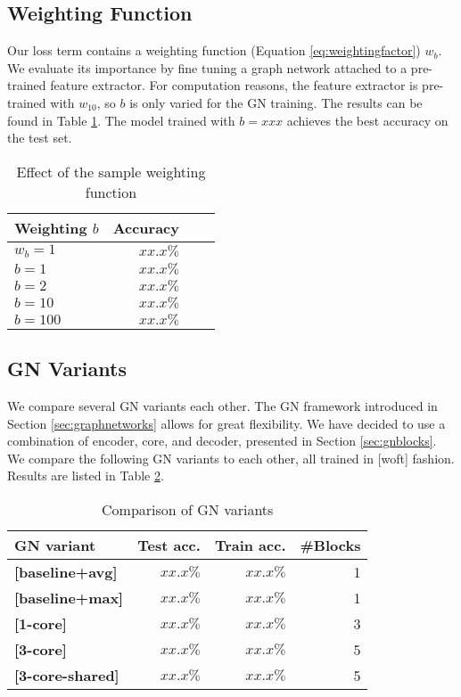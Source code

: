 \subsection{Weighting Function}

Our loss term contains a weighting function (Equation \ref{eq:weightingfactor}) $w_b$. We evaluate its importance by fine tuning a graph network attached to a pre-trained feature extractor. For computation reasons, the feature extractor is pre-trained with $w_{10}$, so $b$ is only varied for the GN training. The results can be found in Table \ref{tab:weightingbase}. The model trained with $b=xxx$ achieves the best accuracy on the test set.

\begin{table}
    \centering
    \begin{tabular}{lrrr}
        \textbf{Weighting $b$} & \textbf{Accuracy}\\\hline
        $w_b=1$ & $xx.x\%$\\
        $b=1$ & $xx.x\%$\\
        $b=2$ & $xx.x\%$\\
        $b=10$ & $xx.x\%$\\
        $b=100$ & $xx.x\%$\\
    \end{tabular}
    \caption[Effect of the sample weighting function]{Effect of the sample weighting function}
    \label{tab:weightingbase}
\end{table}

\subsection{GN Variants}

We compare several GN variants each other. The GN framework introduced in Section \ref{sec:graphnetworks} allows for great flexibility. We have decided to use a combination of encoder, core, and decoder, presented in Section \ref{sec:gnblocks}.
We compare the following GN variants to each other, all trained in [woft] fashion. Results are listed in Table \ref{tab:gnvariantscomparison}.

\begin{table}
    \centering
    \begin{tabular}{lrrr}
        \textbf{GN variant} & \textbf{Test acc.} & \textbf{Train acc.} & \textbf{\#Blocks}\\\hline
        \textbf{[baseline+avg]} & $xx.x\%$ & $xx.x\%$ & 1\\
        \textbf{[baseline+max]} & $xx.x\%$ & $xx.x\%$ & 1\\
        \textbf{[1-core]} & $xx.x\%$ & $xx.x\%$ & 3\\
        \textbf{[3-core]} & $xx.x\%$ & $xx.x\%$ & 5\\
        \textbf{[3-core-shared]} & $xx.x\%$ & $xx.x\%$ & 5\\
    \end{tabular}
    \caption[Comparison of GN variants]{Comparison of GN variants}
    \label{tab:gnvariantscomparison}
\end{table}

